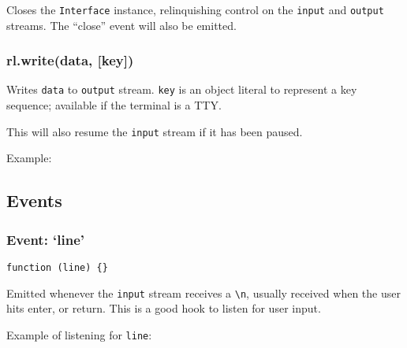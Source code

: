 Closes the \texttt{Interface} instance, relinquishing control on the
\texttt{input} and \texttt{output} streams. The ``close'' event will
also be emitted.

\subsubsection{rl.write(data, {[}key{]})}

Writes \texttt{data} to \texttt{output} stream. \texttt{key} is an
object literal to represent a key sequence; available if the terminal is
a TTY.

This will also resume the \texttt{input} stream if it has been paused.

Example:

\begin{Shaded}
\begin{Highlighting}[]
\NormalTok{(}\NormalTok{);}
\NormalTok{: }\NormalTok{, }\NormalTok{: }\NormalTok{\});}
\end{Highlighting}
\end{Shaded}

\subsection{Events}

\subsubsection{Event: `line'}

\texttt{function (line) \{\}}

Emitted whenever the \texttt{input} stream receives a
\texttt{\textbackslash{}n}, usually received when the user hits enter,
or return. This is a good hook to listen for user input.

Example of listening for \texttt{line}:

\begin{Shaded}
\begin{Highlighting}[]
\NormalTok{(}\NormalTok{, } 
  \NormalTok{(}
\NormalTok{\});}
\end{Highlighting}
\end{Shaded}

